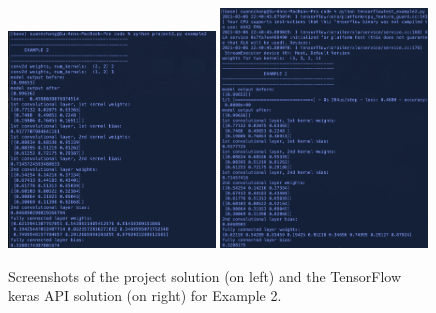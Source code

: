 \documentclass[12pt]{amsart}
\begin{document}
\begin{figure}[h]
\includegraphics[height=0.33\textheight, width=0.49\textwidth]{ex2_proj.png}
\includegraphics[height=0.33\textheight, width=0.49\textwidth]{ex2_tf.png}
\caption{Screenshots of the project solution (on left) and the TensorFlow keras API solution (on right) for Example 2.}
\end{figure}

\end{document}
